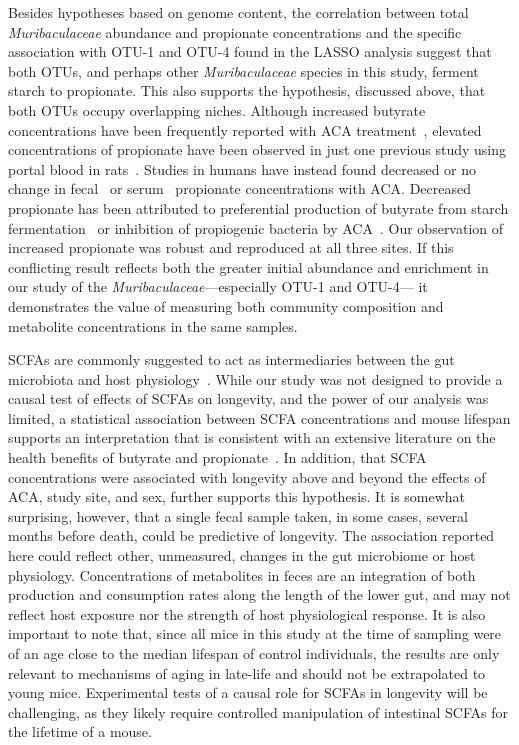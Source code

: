 \documentclass{doc/template/bmcart-nofigbox}
\newcommand{\frnlang}[1]{\textit{#1}}
\newcommand{\taxon}[1]{\frnlang{#1}}
\begin{document}
Besides hypotheses based on genome content,
the correlation between total \taxon{Muribaculaceae} abundance and propionate
concentrations and the specific association with OTU-1 and OTU-4
found in the LASSO analysis
suggest that both OTUs, and perhaps other
\taxon{Muribaculaceae} species in this study, ferment starch to propionate.
This also supports the hypothesis, discussed above, that both OTUs occupy
overlapping niches.
Although increased butyrate concentrations have been frequently reported with
ACA treatment~\cite{Weaver1997, Wolever2000, Dehghan-Kooshkghazi2004, Weaver2000, Wolin1999},
elevated concentrations of propionate have been observed in
just one previous study using portal blood in rats~\cite{Dehghan-Kooshkghazi2004}.
Studies in humans have instead found decreased
or no change in fecal~\cite{Holt1996, Weaver1997, Weaver2000} or
serum~\cite{Wolever2000} propionate concentrations with ACA\@.
Decreased propionate has been
attributed to preferential production of butyrate from starch
fermentation~\cite{Weaver1992, Cummings1987} or inhibition of propiogenic
bacteria by ACA~\cite{Weaver1997}.
Our observation of increased propionate was robust and reproduced at all three
sites.
If this conflicting result reflects both the greater initial abundance and
enrichment in our study of the \taxon{Muribaculaceae}---especially OTU-1 and
OTU-4--- it demonstrates the value of measuring both community composition
and metabolite concentrations in the same samples.

SCFAs are commonly suggested to act as intermediaries between the gut
microbiota and host physiology~\cite{Koh2016}.
While our study was not designed to provide a causal test of effects of
SCFAs on longevity, and the power of our analysis was limited,
a statistical association between
SCFA concentrations and mouse lifespan supports an interpretation
that is consistent with an extensive literature on the health benefits of
butyrate and propionate~\cite{Koh2016}.
In addition, that SCFA concentrations were associated with longevity above and
beyond the effects of ACA, study site, and sex, further supports this
hypothesis.
It is somewhat surprising, however, that a single fecal sample taken, in some
cases, several months before death, could be predictive of longevity.
The association reported here could reflect other, unmeasured, changes in the
gut microbiome or host physiology.
Concentrations of metabolites in feces are an integration of both
production and consumption rates along the length of the lower gut, and may not
reflect host exposure nor the strength of host physiological response.
It is also important to note that, since all mice in this study at the time of
sampling were of an age close to the median lifespan of control individuals,
the results are only relevant to mechanisms of aging in late-life and should
not be extrapolated to young mice.
Experimental tests of a causal role for SCFAs in longevity will be challenging,
as they likely require controlled manipulation of intestinal SCFAs for the
lifetime of a mouse.
\end{document}
